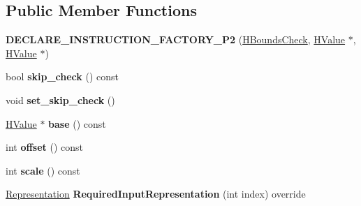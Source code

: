 \subsection*{Public Member Functions}
\begin{DoxyCompactItemize}
\item 
{\bfseries D\+E\+C\+L\+A\+R\+E\+\_\+\+I\+N\+S\+T\+R\+U\+C\+T\+I\+O\+N\+\_\+\+F\+A\+C\+T\+O\+R\+Y\+\_\+\+P2} (\hyperlink{classv8_1_1internal_1_1_h_bounds_check}{H\+Bounds\+Check}, \hyperlink{classv8_1_1internal_1_1_h_value}{H\+Value} $\ast$, \hyperlink{classv8_1_1internal_1_1_h_value}{H\+Value} $\ast$)\hypertarget{classv8_1_1internal_1_1_h_bounds_check_afd5fdfebe1c5384f75d2e663947d9ca6}{}\label{classv8_1_1internal_1_1_h_bounds_check_afd5fdfebe1c5384f75d2e663947d9ca6}

\item 
bool {\bfseries skip\+\_\+check} () const \hypertarget{classv8_1_1internal_1_1_h_bounds_check_aad01ecc375194b22b1fd81dcecd3fb23}{}\label{classv8_1_1internal_1_1_h_bounds_check_aad01ecc375194b22b1fd81dcecd3fb23}

\item 
void {\bfseries set\+\_\+skip\+\_\+check} ()\hypertarget{classv8_1_1internal_1_1_h_bounds_check_a8a44932fd0deebcf576428b1d161f0bd}{}\label{classv8_1_1internal_1_1_h_bounds_check_a8a44932fd0deebcf576428b1d161f0bd}

\item 
\hyperlink{classv8_1_1internal_1_1_h_value}{H\+Value} $\ast$ {\bfseries base} () const \hypertarget{classv8_1_1internal_1_1_h_bounds_check_aedf9ce1d98a6a02c2b05c37be257d2ca}{}\label{classv8_1_1internal_1_1_h_bounds_check_aedf9ce1d98a6a02c2b05c37be257d2ca}

\item 
int {\bfseries offset} () const \hypertarget{classv8_1_1internal_1_1_h_bounds_check_a37cd603e511443550d129e7882b651d1}{}\label{classv8_1_1internal_1_1_h_bounds_check_a37cd603e511443550d129e7882b651d1}

\item 
int {\bfseries scale} () const \hypertarget{classv8_1_1internal_1_1_h_bounds_check_a74580628e38a27caafd01bd241158f0a}{}\label{classv8_1_1internal_1_1_h_bounds_check_a74580628e38a27caafd01bd241158f0a}

\item 
\hyperlink{classv8_1_1internal_1_1_representation}{Representation} {\bfseries Required\+Input\+Representation} (int index) override\hypertarget{classv8_1_1internal_1_1_h_bounds_check_ac2873aaa9b30420b68e9ffb2d9b642f9}{}\label{classv8_1_1internal_1_1_h_bounds_check_ac2873aaa9b30420b68e9ffb2d9b642f9}


\end{DoxyCompactItemize}
